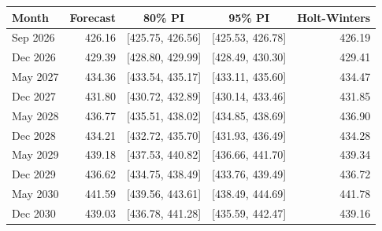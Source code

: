 
\begin{tabular}[t]{lrccr}
\toprule
Month & Forecast & 80\% PI & 95\% PI & Holt-Winters\\
\midrule
Sep 2026 & 426.16 & {}[425.75, 426.56] & {}[425.53, 426.78] & 426.19\\
Dec 2026 & 429.39 & {}[428.80, 429.99] & {}[428.49, 430.30] & 429.41\\
May 2027 & 434.36 & {}[433.54, 435.17] & {}[433.11, 435.60] & 434.47\\
Dec 2027 & 431.80 & {}[430.72, 432.89] & {}[430.14, 433.46] & 431.85\\
May 2028 & 436.77 & {}[435.51, 438.02] & {}[434.85, 438.69] & 436.90\\
Dec 2028 & 434.21 & {}[432.72, 435.70] & {}[431.93, 436.49] & 434.28\\
May 2029 & 439.18 & {}[437.53, 440.82] & {}[436.66, 441.70] & 439.34\\
Dec 2029 & 436.62 & {}[434.75, 438.49] & {}[433.76, 439.49] & 436.72\\
May 2030 & 441.59 & {}[439.56, 443.61] & {}[438.49, 444.69] & 441.78\\
Dec 2030 & 439.03 & {}[436.78, 441.28] & {}[435.59, 442.47] & 439.16\\
\bottomrule
\end{tabular}
